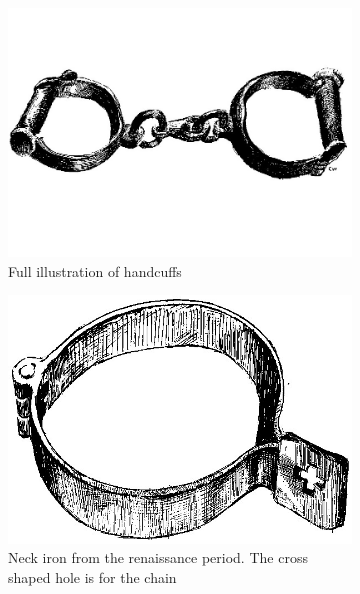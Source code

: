 \begin{figure}
    \centering
    \begin{subfigure}[h!]{0.3\textwidth}
        \includegraphics[width=\textwidth]{figures/chains0.jpg}
        \caption{Full illustration of handcuffs}\label{fig:chains0}
    \end{subfigure}
    \hfill
    \begin{subfigure}[h!]{0.3\textwidth}
        \includegraphics[width=\textwidth]{figures/chains1.jpg}
        \caption{Neck iron from the renaissance period. The cross shaped hole is for the chain}\label{fig:chains1}
    \end{subfigure}
    \hfill
    \begin{subfigure}[h!]{0.3\textwidth}

\end{subfigure}
\end{figure}
